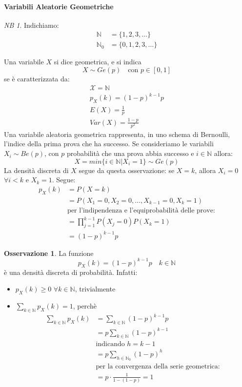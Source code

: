 \documentclass{article}
\theoremstyle{plain}
\theoremstyle{definition}
\newtheorem{osservazione}{Osservazione}[section]
\theoremstyle{remark}
\newtheorem*{NB}{NB}
\begin{document}
\paragraph{Variabili Aleatorie Geometriche} %
\label{par:variabili_aleatorie_geometriche}
\begin{NB}
	Indichiamo:
	\begin{align*}
		\mathds{N}&=\{1,2,3,\dots\}\\
		\mathds{N}_0&=\{0,1,2,3,\dots\}
	\end{align*}
\end{NB}
Una variabile $X$ si dice geometrica, e si indica
\begin{equation*}
	X\sim Ge(p)\quad\text{con }p\in[0,1]
\end{equation*}
se è caratterizzata da:
\begin{align*}
	\mathcal{X}=\mathds{N}\\
	p_X(k)=(1-p)^{k-1}p\\
	E(X)=\frac{1}{p}\\
	Var(X)=\frac{1-p}{p^2}
\end{align*}
Una variabile aleatoria geometrica rappresenta, in uno schema di Bernoulli, l'indice della prima prova che ha successo. Se consideriamo le variabili $X_i\sim Be(p)$, con $p$ probabilità che una prova abbia successo e $i\in\mathds{N}$ allora:
\begin{equation*}
	X=min\{i\in\mathds{N}|X_i=1\}\sim Ge(p)
\end{equation*}
La densità discreta di $X$ segue da questa osservazione: se $X=k$, allora $X_i=0$ $\forall i<k$ e $X_k=1$. Segue:
\begin{align*}
	p_X(k)&=P(X=k)\\
	&=P(X_1=0, X_2=0,\dots, X_{k-1}=0, X_k=1)\\
	&\text{per l'indipendenza e l'equiprobabilità delle prove:}\\
	&=\prod_{j=1}^{k-1} P(X_j=0)P(X_k=1)\\
	&=(1-p)^{k-1}p
\end{align*}
\begin{osservazione}
	La funzione
	\begin{equation*}
		p_X(k)=(1-p)^{k-1}p\quad k\in\mathds{N}
	\end{equation*}
	è una densità discreta di probabilità. Infatti:
	\begin{itemize}
		\item $p_X(k)\geq0$ $\forall k\in\mathds{N}$, trivialmente
		\item $\sum_{k\in\mathds{N}}p_X(k)=1$, perchè
		\begin{align*}
			\sum_{k\in\mathds{N}}p_X(k)&=\sum_{k\in\mathds{N}}(1-p)^{k-1}p\\
			&=p\sum_{k\in\mathds{N}}(1-p)^{k-1}\\
			&\text{indicando }h=k-1\\
			&=p\sum_{h\in\mathds{N}_0}(1-p)^h\\
			&\text{per la convergenza della serie geometrica:}\\
			&=p\cdot\frac{1}{1-(1-p)}=1
		\end{align*}
	\end{itemize}
\end{osservazione}
\end{document}
